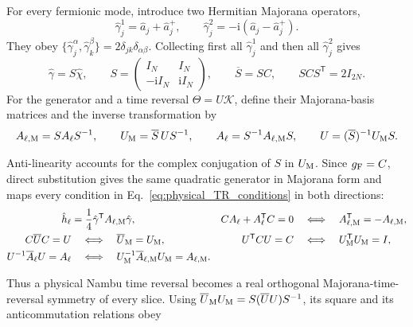 \documentclass[onecolumn,aps,prb,amsmath,amssymb,superscriptaddress,longbibliography]{revtex4-2}
\newcommand{\ii}{\mathrm{i}}
\newcommand{\trans}{\mathsf{T}}
\newcommand{\mc}[1]{\mathcal{#1}}
\begin{document}
For every fermionic mode, introduce two Hermitian Majorana operators,
\begin{equation}
    \hat\gamma_j^1=\hat a_j+\hat a_j^+,
    \qquad
    \hat\gamma_j^2=-\ii(\hat a_j-\hat a_j^+).
    \label{eq:nambu_majorana_operators}
\end{equation}
They obey \(\{\hat\gamma_j^\alpha,\hat\gamma_k^\beta\}=2\delta_{jk}\delta_{\alpha\beta}\).  Collecting first all \(\hat\gamma_j^1\) and then all \(\hat\gamma_j^2\) gives
\begin{equation}
    \hat\gamma=S\hat\chi,
    \qquad
    S=\begin{pmatrix}I_N&I_N\\-\ii I_N&\ii I_N\end{pmatrix},
    \qquad
    \overline S=SC,
    \qquad
    SCS^\trans=2I_{2N}.
    \label{eq:nambu_majorana_basis}
\end{equation}
For the generator and a time reversal \(\Theta=U\mc K\), define their Majorana-basis matrices and the inverse transformation by
\begin{equation}
    A_{\ell,{\rm M}}=SA_\ell S^{-1},
    \qquad
    U_{\rm M}=\overline S\,U S^{-1},
    \qquad
    A_\ell=S^{-1}A_{\ell,{\rm M}}S,
    \qquad
    U=(\overline S)^{-1}U_{\rm M}S.
    \label{eq:majorana_TR_dictionary}
\end{equation}
\begin{samepage}
Anti-linearity accounts for the complex conjugation of \(S\) in \(U_{\rm M}\).  Since \(g_{\rm F}=C\), direct substitution gives the same quadratic generator in Majorana form and maps every condition in Eq.~\eqref{eq:physical_TR_conditions} in both directions:
\begin{align}
    \hat h_\ell
    &=\frac14\hat\gamma^\trans A_{\ell,{\rm M}}\hat\gamma,
    &
    CA_\ell+A_\ell^\trans C=0
    &\quad\Longleftrightarrow\quad
    A_{\ell,{\rm M}}^\trans=-A_{\ell,{\rm M}},
    \label{eq:majorana_generator_dictionary}\\
    C\overline U C=U
    &\quad\Longleftrightarrow\quad
    \overline U_{\rm M}=U_{\rm M},
    &
    U^\trans C U=C
    &\quad\Longleftrightarrow\quad
    U_{\rm M}^\trans U_{\rm M}=I,
    \notag\\
    U^{-1}\overline{A}_\ell U=A_\ell
    &\quad\Longleftrightarrow\quad
    U_{\rm M}^{-1}\overline{A}_{\ell,{\rm M}}U_{\rm M}
    =A_{\ell,{\rm M}}.
    \label{eq:majorana_TR_conditions}
\end{align}
\end{samepage}
Thus a physical Nambu time reversal becomes a real orthogonal Majorana-time-reversal symmetry of every slice.  Using \(\overline U_{\rm M}U_{\rm M}=S(\overline U U)S^{-1}\), its square and its anticommutation relations obey
\end{document}

